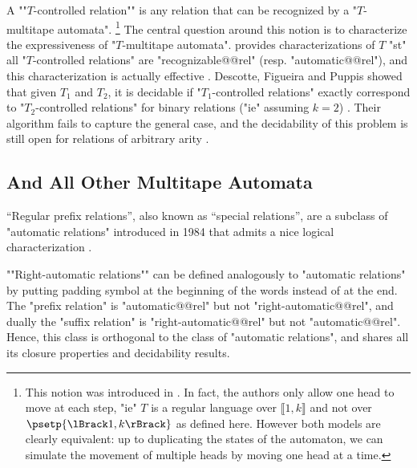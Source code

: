 A \AP""$T$-controlled relation"" is any relation that can be recognized by
a "$T$-multitape automata".%
\footnote{This notion was introduced in \cite[\S~3]{FigueiraLibkin2015SynchronizingRelations}.
In fact, the authors only allow one head to move at each step, "ie" $T$ is a regular language
over $\lBrack 1,k\rBrack$ and not over $\psetp{\lBrack 1,k\rBrack}$ as defined here. However both
models are clearly equivalent: up to duplicating the states of the automaton, we can simulate
the movement of multiple heads by moving one head at a time.}
The central question around this notion is to characterize the
expressiveness of "$T$-multitape automata".
\cite[Theorem~1]{FigueiraLibkin2015SynchronizingRelations} provides characterizations 
of $T$ "st" all "$T$-controlled relations" are "recognizable@@rel" (resp. "automatic@@rel"),
and this characterization is actually effective
\cite[Corollary~3]{FigueiraLibkin2015SynchronizingRelations}.
Descotte, Figueira and Puppis showed
that given $T_1$ and $T_2$, it is decidable
if "$T_1$-controlled relations" exactly correspond to "$T_2$-controlled relations"
for binary relations ("ie" assuming $k=2$)
\cite[Main Theorem]{DescotteFigueiraPuppis2018ResynchronizingClasses}.
Their algorithm fails to capture the general case, and the decidability of this problem
is still open for relations of arbitrary arity
\cite[\S~9]{DescotteFigueiraPuppis2018ResynchronizingClasses}.


\subsection{And All Other Multitape Automata}

``Regular prefix relations'', also known as ``special relations'', are a subclass of "automatic relations" introduced in 1984 that admits a nice logical characterization
\cite[\S~``1984'']{Choffrut2006Survey}.

\AP""Right-automatic relations"" can be defined analogously to "automatic relations"
by putting padding symbol at the beginning of the words instead of at the end.
The "prefix relation" is "automatic@@rel" but not "right-automatic@@rel", and dually
the "suffix relation" is "right-automatic@@rel" but not "automatic@@rel".
Hence, this class is orthogonal to the class of "automatic relations",
and shares all its closure properties and decidability results.
 
